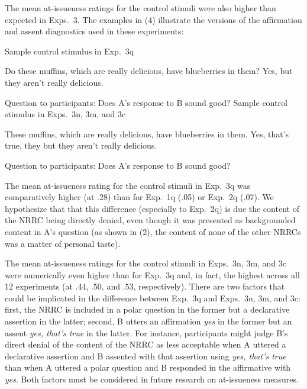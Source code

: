 \documentclass[11pt,fleqn]{article}
\newcommand{\6}{\mbox{$[\hspace*{-.6mm}[$}}
\newcommand{\9}{\mbox{$]\hspace*{-.6mm}]$}}
\begin{document}
  The mean at-issueness ratings for the control stimuli were also higher than expected in Exps.~3. The examples in (4) illustrate the versions of the affirmation and assent diagnostics used in these experiments:

  \begin{exe}
  \begin{xlist}
  \ex Sample control stimulus in Exp.~3q
  \begin{xlist}
   Do these muffins, which are really delicious, have blueberries in them?
   Yes, but they aren't really delicious.
  \end{xlist}
  Question to participants: Does A's response to B sound good?
  \ex Sample control stimulus in Exps.~3n, 3m, and 3c
  \begin{xlist}
   These muffins, which are really delicious, have blueberries in them.
   Yes, that's true, they but they aren't really delicious.
  \end{xlist}
  Question to participants: Does A's response to B sound good?
  \end{xlist}
  \end{exe}

  The mean at-issueness rating for the control stimuli in Exp.~3q was comparatively higher (at .28) than for Exp.~1q (.05) or Exp.~2q (.07). We hypothesize that that this difference (especially to Exp.~2q) is due the content of the NRRC being directly denied, even though it was presented as backgrounded content in A's question (as shown in (2), the content of none of the other NRRCs was a matter of personal taste).

  The mean at-issueness ratings for the control stimuli in Exps.~3n, 3m, and 3c were numerically even higher than for Exp.~3q and, in fact, the highest across all 12 experiments (at .44, .50, and .53, respectively). There are two factors that could be implicated in the difference between Exp.~3q and Exps.~3n, 3m, and 3c: first, the NRRC is included in a polar question in the former but a declarative assertion in the latter; second, B utters an affirmation {\em yes} in the former but an assent {\em yes, that's true} in the latter. For instance, participants might judge B's direct denial of the content of the NRRC as less acceptable when A uttered a declarative assertion and B assented with that assertion using {\em yes, that's true} than when A uttered a polar question and B responded in the affirmative with {\em yes}. Both factors must be considered in future research on at-issueness measures.
\end{document}
